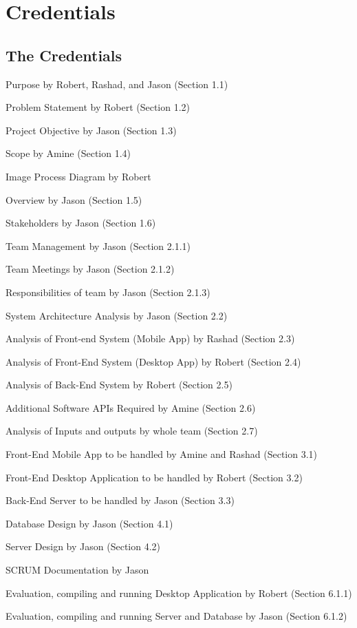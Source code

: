 \documentclass[a4paper,12pt]{article}
\begin{document}
\pagebreak
\section{Credentials}
\subsection{The Credentials}
\begin{description}
\setlength\itemsep{0em}
\item Purpose by Robert, Rashad, and Jason (Section 1.1)
\item Problem Statement by Robert (Section 1.2)
\item Project Objective by Jason (Section 1.3)
\item Scope by Amine (Section 1.4)
\item Image Process Diagram by Robert
\item Overview by Jason (Section 1.5)
\item Stakeholders by Jason (Section 1.6)
\item Team Management by Jason (Section 2.1.1)
\item Team Meetings by Jason (Section 2.1.2)
\item Responsibilities of team by Jason (Section 2.1.3)
\item System Architecture Analysis by Jason (Section 2.2)
\item Analysis of Front-end System (Mobile App) by Rashad (Section 2.3)
\item Analysis of Front-End System (Desktop App) by Robert (Section 2.4)
\item Analysis of Back-End System by Robert (Section 2.5)
\item Additional Software APIs Required by Amine (Section 2.6)
\item Analysis of Inputs and outputs by whole team (Section 2.7)
\item Front-End Mobile App to be handled by Amine and Rashad (Section 3.1)
\item Front-End Desktop Application to be handled by Robert (Section 3.2)
\item Back-End Server to be handled by Jason (Section 3.3)
\item Database Design by Jason (Section 4.1)
\item Server Design by Jason (Section 4.2)
\item SCRUM Documentation by Jason
\item Evaluation, compiling and running Desktop Application by Robert (Section 6.1.1)
\item Evaluation, compiling and running Server and Database by Jason (Section 6.1.2)

\end{description}
\end{document}
